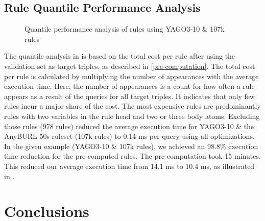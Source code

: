 \documentclass[english]{lni}
\begin{document}
\subsection{Rule Quantile Performance Analysis} 
\label{quintile-analysis}

\begin{figure}[t]
\caption{Quantile performance analysis of rules using YAGO3-10 \& 107k rules}
\label{fig:quantile-analysis}
\end{figure}


The quantile analysis in  is based on the total cost per rule after using the validation set as target triples, as described in \ref{pre-computation}. The total cost per rule is calculated by multiplying the number of appearances with the average execution time. Here, the number of appearances is a count for how often a rule appears as a result of the queries for all target triples. It indicates that only few rules incur a major share of the cost. The most expensive rules are predominantly rules with two variables in the rule head and two or three body atoms. Excluding those rules (978 rules) reduced the average execution time for YAGO3-10 \& the AnyBURL 50s ruleset (107k rules) to 0.14 ms per query using all optimizations. In the given example (YAGO3-10 \& 107k rules), we achieved an 98.8\% execution time reduction for the pre-computed rules. The pre-computation took 15 minutes. This reduced our average execution time from 14.1 ms to 10.4 ms, as illustrated in .


\section{Conclusions}
\end{document}
